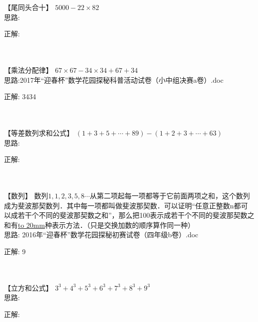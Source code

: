 \item {
    【尾同头合十】
    $5000- 22\times 82$  
    \ifshowSolution
        \fangsong{}
        \\
        思路:

        正解: 
    \else
        \\ \\ \\
    \fi
}

\item {
    【乘法分配律】
    $67\times 67 - 34\times 34 + 67 + 34$
    \ifshowSolution
        \fangsong{}
        \\
        思路:2017年“迎春杯”数学花园探秘科普活动试卷（小中组决赛a卷）.doc

        正解: 3434
    \else
        \\ \\ \\
    \fi
}

\item {
    【等差数列求和公式】
    $(1+3+5+\cdots + 89) - (1+2+3+\cdots + 63)$  
    \ifshowSolution
        \fangsong{}
        \\
        思路:

        正解: 
    \else
        \\ \\ \\
    \fi
}

\item {
    【数列】
    数列$1, 1,2,3,5,8\cdots$从第二项起每一项都等于它前面两项之和，这个数列成为斐波那契数列．其中每一项都叫做斐波那契数．可以证明“任意正整数n都可以成若干个不同的斐波那契数之和”，那么把100表示成若干个不同的斐波那契数之和有\underline{\hbox to 20mm{}}种表示方法．（只是交换加数的顺序算作同一种）  
    \ifshowSolution
        \fangsong{}
        \\
        思路: 2016年“迎春杯”数学花园探秘初赛试卷（四年级b卷）.doc

        正解: 9
    \else
        \\ \\ \\
    \fi
}

\item {
    【立方和公式】
    $3^3 + 4^3 + 5^3 + 6^3 + 7^3 + 8^3 + 9^3$
    \ifshowSolution
        \fangsong{}
        \\
        思路:

        正解: 
    \else
        \\ \\ \\
    \fi
}

